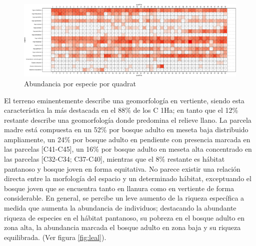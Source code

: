 \documentclass[11pt,]{article}
\begin{document}
\begin{figure}
\centering
\includegraphics{manuscrito_files/figure-latex/unnamed-chunk-3-1.pdf}
\caption{\label{fig:abun_sp_q}Abundancia por especie por quadrat}
\end{figure}

El terreno eminentemente describe una geomorfología en vertiente, siendo
esta característica la más destacada en el 88\% de los C 1Ha; en tanto
que el 12\% restante describe una geomorfología donde predomina el
relieve llano. La parcela madre está compuesta en un 52\% por bosque
adulto en meseta baja distribuido ampliamente, un 24\% por bosque adulto
en pendiente con presencia marcada en las parcelas {[}C41-C45{]}, un
16\% por bosque adulto en meseta alta concentrado en las parcelas
{[}C32-C34; C37-C40{]}, mientras que el 8\% restante es hábitat
pantanoso y bosque joven en forma equitativa. No parece existir una
relación directa entre la morfología del espacio y un determinado
hábitat, exceptuando el bosque joven que se encuentra tanto en llanura
como en vertiente de forma considerable. En general, se percibe un leve
aumento de la riqueza específica a medida que aumenta la abundancia de
individuos; destacando la abundante riqueza de especies en el hábitat
pantanoso, su pobreza en el bosque adulto en zona alta, la abundancia
marcada el bosque adulto en zona baja y su riqueza equilibrada. (Ver
figura \ref{fig:leal}).
\end{document}
